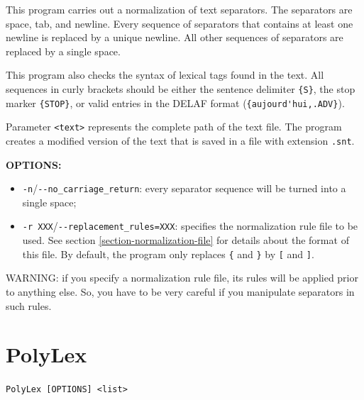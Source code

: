 \bigskip
\noindent {}This 
program carries out a normalization of text separators. The separators are
space, tab, and newline. Every sequence of separators that contains at least one
newline is replaced by a unique newline. All other sequences of separators are
replaced by a single space.

\bigskip
\noindent This program also checks the syntax of lexical tags found in the text. All
sequences in curly brackets should be either the sentence delimiter \verb+{S}+,
the stop marker \verb+{STOP}+, or valid entries in the DELAF format (\verb+{aujourd'hui,.ADV}+). 

\bigskip
\noindent {}Parameter \verb+<text>+ 
represents the complete path of the text file. The program
creates a modified version of the text that is saved in a file with extension
\verb+.snt+.

\bigskip
\noindent \textbf{OPTIONS:}
\begin{itemize}
  \item \verb+-n+/\verb+--no_carriage_return+: every separator sequence will be turned into a single space;
  
  \item \verb+-r XXX+/\verb+--replacement_rules=XXX+: specifies the
  normalization rule file to be used. See section \ref{section-normalization-file} 
  for details about the format of
  this file. By default, the program only replaces \verb+{+ and \verb+}+ by
  \verb+[+ and \verb+]+.
\end{itemize}

\bigskip
\noindent WARNING: if you specify a normalization rule file, its rules will be
applied prior to anything else. So, you have to be very careful if you
manipulate separators in such rules.






\section{PolyLex}
\verb+PolyLex [OPTIONS] <list>+


